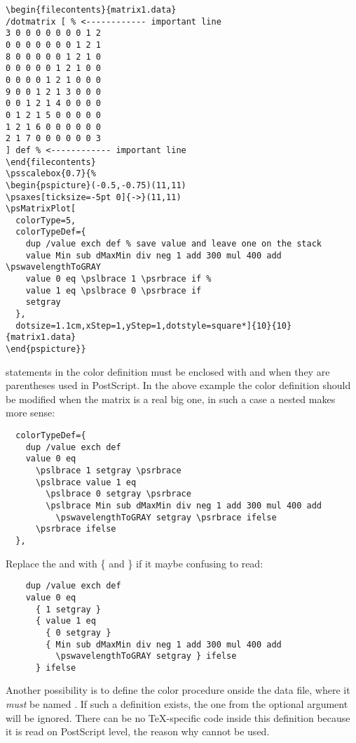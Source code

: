 \documentclass[11pt,english,BCOR10mm,DIV12,bibliography=totoc,parskip=false,smallheadings
    headexclude,footexclude,oneside]{pst-doc}
\begin{document}
\begin{lstlisting}
\begin{filecontents}{matrix1.data}
/dotmatrix [ % <------------ important line
3 0 0 0 0 0 0 0 1 2
0 0 0 0 0 0 0 1 2 1
8 0 0 0 0 0 1 2 1 0
0 0 0 0 0 1 2 1 0 0
0 0 0 0 1 2 1 0 0 0
9 0 0 1 2 1 3 0 0 0
0 0 1 2 1 4 0 0 0 0
0 1 2 1 5 0 0 0 0 0
1 2 1 6 0 0 0 0 0 0
2 1 7 0 0 0 0 0 0 3
] def % <------------ important line
\end{filecontents}
\psscalebox{0.7}{%
\begin{pspicture}(-0.5,-0.75)(11,11)
\psaxes[ticksize=-5pt 0]{->}(11,11)
\psMatrixPlot[
  colorType=5,
  colorTypeDef={
    dup /value exch def % save value and leave one on the stack
    value Min sub dMaxMin div neg 1 add 300 mul 400 add \pswavelengthToGRAY 
    value 0 eq \pslbrace 1 \psrbrace if % 
    value 1 eq \pslbrace 0 \psrbrace if  
    setgray 
  },
  dotsize=1.1cm,xStep=1,yStep=1,dotstyle=square*]{10}{10}{matrix1.data}
\end{pspicture}}
\end{lstlisting}


 statements in the color definition must be enclosed with  and 
when they are parentheses used in PostScript. In the above example the color definition should be
modified when the matrix is a real big one, in such a case a nested  makes more sense:

\begin{lstlisting}
  colorTypeDef={
    dup /value exch def 
    value 0 eq 
      \pslbrace 1 setgray \psrbrace
      \pslbrace value 1 eq 
        \pslbrace 0 setgray \psrbrace
        \pslbrace Min sub dMaxMin div neg 1 add 300 mul 400 add
          \pswavelengthToGRAY setgray \psrbrace ifelse
      \psrbrace ifelse 
  },
\end{lstlisting}

Replace the  and  with \{ and \} if it maybe confusing to read:

\begin{lstlisting}
    dup /value exch def 
    value 0 eq 
      { 1 setgray }
      { value 1 eq 
        { 0 setgray }
        { Min sub dMaxMin div neg 1 add 300 mul 400 add
          \pswavelengthToGRAY setgray } ifelse
      } ifelse 
\end{lstlisting}

Another possibility is to define the color procedure onside the data file, where
it \emph{must} be named . If such a definition exists, the one from
the optional argument  will be ignored. There can be no
\TeX-specific code inside this definition because it is read on PostScript level,
the reason why  cannot be used.
\end{document}
